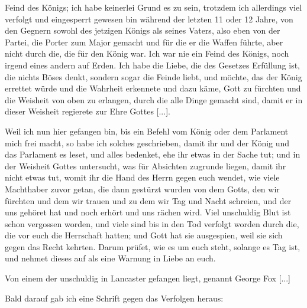 {  Feind des Königs; ich habe keinerlei Grund es zu sein, trotzdem
  ich allerdings viel verfolgt und eingesperrt gewesen bin während
  der letzten 11 oder 12 Jahre, von den Gegnern sowohl des
  jetzigen Königs als seines Vaters, also eben von der Partei, die
  Porter zum Major gemacht und für die er die Waffen führte,
  aber nicht durch die, die für den König war. Ich war nie ein
  Feind des Königs, noch irgend eines andern auf Erden. Ich
  habe die Liebe, die des Gesetzes Erfüllung ist, die nichts Böses
  denkt, sondern sogar die Feinde liebt, und möchte, das der König
  errettet würde und die Wahrheit erkennete und dazu käme, Gott
  zu fürchten und die Weisheit von oben zu erlangen, durch die
  alle Dinge gemacht sind, damit er in dieser Weisheit regierete zur
  Ehre Gottes [...].

  \medskip 

  Weil ich nun hier gefangen bin, bis ein Befehl vom König
  oder dem Parlament mich frei macht, so habe ich solches geschrieben, 
  damit ihr und der König und das Parlament es
  leset, und alles bedenket, ehe ihr etwas in der Sache tut; und
  in der Weisheit Gottes untersucht, was für Absichten zugrunde 
  liegen, damit ihr nicht etwas tut, womit 
  ihr die Hand 
  des Herrn gegen euch wendet, wie viele Machthaber zuvor getan,
  die dann gestürzt wurden von dem Gotts, den wir fürchten und
  dem wir trauen und zu dem wir Tag und Nacht schreien, und
  der uns gehöret hat und noch erhört und uns rächen wird. Viel
  unschuldig Blut ist schon vergossen worden, und viele sind bis in
  den Tod verfolgt worden durch die, die vor euch die Herrschaft
  hatten; und Gott hat sie ausgespien, weil sie sich gegen das
  Recht kehrten. Darum prüfet, wie es um euch steht, solange es
  Tag ist, und nehmet dieses auf als eine Warnung in Liebe
  an euch.

  \medskip 

  Von einem der unschuldig in Lancaster gefangen liegt, genannt
  George Fox [...]

}

Bald darauf gab ich eine Schrift gegen das Verfolgen heraus:

